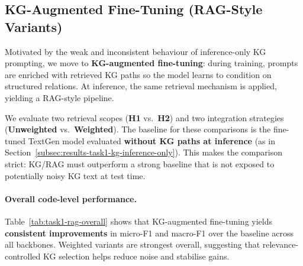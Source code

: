 \subsection{KG-Augmented Fine-Tuning (RAG-Style Variants)}
\label{subsec:results-task1-kg-rag}

Motivated by the weak and inconsistent behaviour of inference-only KG prompting, we move to \textbf{KG-augmented fine-tuning}: during training, prompts are enriched with retrieved KG paths so the model learns to condition on structured relations. At inference, the same retrieval mechanism is applied, yielding a RAG-style pipeline.

We evaluate two retrieval scopes (\textbf{H1} vs.\ \textbf{H2}) and two integration strategies (\textbf{Unweighted} vs.\ \textbf{Weighted}). The baseline for these comparisons is the fine-tuned TextGen model evaluated \textbf{without KG paths at inference} (as in Section~\ref{subsec:results-task1-kg-inference-only}). This makes the comparison strict: KG/RAG must outperform a strong baseline that is not exposed to potentially noisy KG text at test time.

\paragraph{Overall code-level performance.}
Table~\ref{tab:task1-rag-overall} shows that KG-augmented fine-tuning yields \textbf{consistent improvements} in micro-F1 and macro-F1 over the baseline across all backbones. Weighted variants are strongest overall, suggesting that relevance-controlled KG selection helps reduce noise and stabilise gains.

